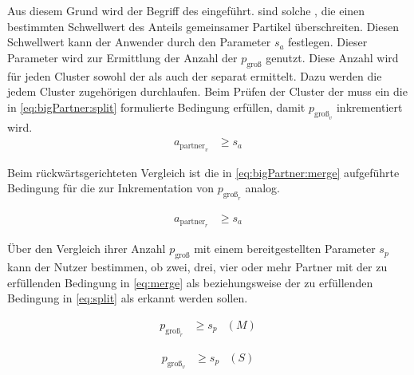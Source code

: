 Aus diesem Grund wird der Begriff des 
eingeführt.  sind solche , die einen bestimmten Schwellwert des Anteils gemeinsamer Partikel überschreiten. Diesen Schwellwert kann der Anwender durch den Parameter $s_a$ festlegen. Dieser Parameter wird zur Ermittlung der Anzahl der  $p_\text{groß}$ genutzt. Diese Anzahl wird für jeden Cluster sowohl der  als auch der  separat ermittelt. Dazu werden die jedem Cluster zugehörigen  durchlaufen. Beim Prüfen der Cluster der  muss ein  die in \autoref{eq:bigPartner:split} formulierte Bedingung erfüllen, damit $p_{\text{groß}_v}$ inkrementiert wird.
\begin{equation}
	\begin{aligned}\label{eq:bigPartner:split}
		a_{\text{partner}_v} &\ge s_a
	\end{aligned}
\end{equation}

Beim rückwärtsgerichteten Vergleich ist die in \autoref{eq:bigPartner:merge} aufgeführte Bedingung für die  zur Inkrementation von $p_{\text{groß}_r}$ analog. 

\begin{equation}
	\begin{aligned}\label{eq:bigPartner:merge}
		a_{\text{partner}_r} &\ge s_a
	\end{aligned}
\end{equation}

Über den Vergleich ihrer Anzahl $p_\text{groß}$ mit einem bereitgestellten Parameter $s_p$ kann der Nutzer bestimmen, ob zwei, drei, vier oder mehr Partner mit der zu erfüllenden Bedingung in \autoref{eq:merge} als  beziehungsweise der zu erfüllenden Bedingung in \autoref{eq:split} als  erkannt werden sollen.

\begin{equation}
\begin{aligned}\label{eq:merge}
p_{\text{groß}_r} &\ge s_p &(M)
\end{aligned}
\end{equation}

\begin{equation}
\begin{aligned}\label{eq:split}
p_{\text{groß}_v} &\ge s_p &(S)
\end{aligned}
\end{equation}

